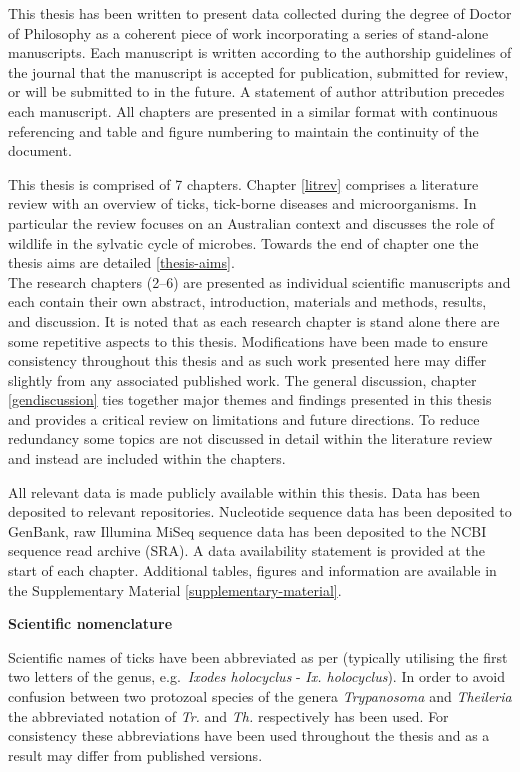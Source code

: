 \documentclass[a4paper, nobind]{templates/ociamthesis}
\begin{document}
This thesis has been written to present data collected during the degree of Doctor of Philosophy as a coherent piece of work incorporating a series of stand-alone manuscripts.
Each manuscript is written according to the authorship guidelines of the journal that the manuscript is accepted for publication, submitted for review, or will be submitted to in the future.
A statement of author attribution precedes each manuscript.
All chapters are presented in a similar format with continuous referencing and table and figure numbering to maintain the continuity of the document.

This thesis is comprised of 7 chapters.
Chapter \ref{litrev} comprises a literature review with an overview of ticks, tick-borne diseases and microorganisms.
In particular the review focuses on an Australian context and discusses the role of wildlife in the sylvatic cycle of microbes.
Towards the end of chapter one the thesis aims are detailed \ref{thesis-aims}.\\
The research chapters (2--6) are presented as individual scientific manuscripts and each contain their own abstract, introduction, materials and methods, results, and discussion.
It is noted that as each research chapter is stand alone there are some repetitive aspects to this thesis.
Modifications have been made to ensure consistency throughout this thesis and as such work presented here may differ slightly from any associated published work.
The general discussion, chapter \ref{gendiscussion} ties together major themes and findings presented in this thesis and provides a critical review on limitations and future directions.
To reduce redundancy some topics are not discussed in detail within the literature review and instead are included within the chapters.

All relevant data is made publicly available within this thesis.
Data has been deposited to relevant repositories.
Nucleotide sequence data has been deposited to GenBank, raw Illumina MiSeq sequence data has been deposited to the NCBI sequence read archive (SRA).
A data availability statement is provided at the start of each chapter.
Additional tables, figures and information are available in the Supplementary Material \ref{supplementary-material}.

\textbf{Scientific nomenclature}

Scientific names of ticks have been abbreviated as per \textcite{dantas-torresStandardizationAbbreviationsGenus2008} (typically utilising the first two letters of the genus, e.g.~\emph{Ixodes holocyclus} - \emph{Ix. holocyclus}).
In order to avoid confusion between two protozoal species of the genera \emph{Trypanosoma} and \emph{Theileria} the abbreviated notation of \emph{Tr.} and \emph{Th.} respectively has been used.
For consistency these abbreviations have been used throughout the thesis and as a result may differ from published versions.
\end{document}
